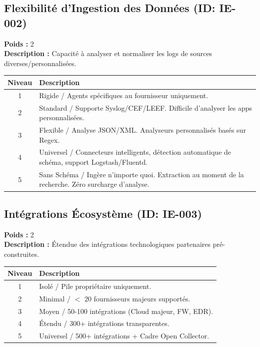 \documentclass{article}
\begin{document}
\subsection{Flexibilité d'Ingestion des Données (ID: IE-002)}
\textbf{Poids :} 2 \\
\textbf{Description :} Capacité à analyser et normaliser les logs de sources diverses/personnalisées.
\vspace{0.3cm}
\begin{longtable}{|c|p{12cm}|}
\hline
\rowcolor{lightgray} \textbf{Niveau} & \textbf{Description} \\ \hline
1 & Rigide / Agents spécifiques au fournisseur uniquement. \\ \hline
2 & Standard / Supporte Syslog/CEF/LEEF. Difficile d'analyser les apps personnalisées. \\ \hline
3 & Flexible / Analyse JSON/XML. Analyseurs personnalisés basés sur Regex. \\ \hline
4 & Universel / Connecteurs intelligents, détection automatique de schéma, support Logstash/Fluentd. \\ \hline
5 & Sans Schéma / Ingère n'importe quoi. Extraction au moment de la recherche. Zéro surcharge d'analyse. \\ \hline
\end{longtable}
\vspace{0.5cm}
\subsection{Intégrations Écosystème (ID: IE-003)}
\textbf{Poids :} 2 \\
\textbf{Description :} Étendue des intégrations technologiques partenaires pré-construites.
\vspace{0.3cm}
\begin{longtable}{|c|p{12cm}|}
\hline
\rowcolor{lightgray} \textbf{Niveau} & \textbf{Description} \\ \hline
1 & Isolé / Pile propriétaire uniquement. \\ \hline
2 & Minimal / $<$ 20 fournisseurs majeurs supportés. \\ \hline
3 & Moyen / 50-100 intégrations (Cloud majeur, FW, EDR). \\ \hline
4 & Étendu / 300+ intégrations transparentes. \\ \hline
5 & Universel / 500+ intégrations + Cadre Open Collector. \\ \hline
\end{longtable}
\vspace{0.5cm}
\end{document}
